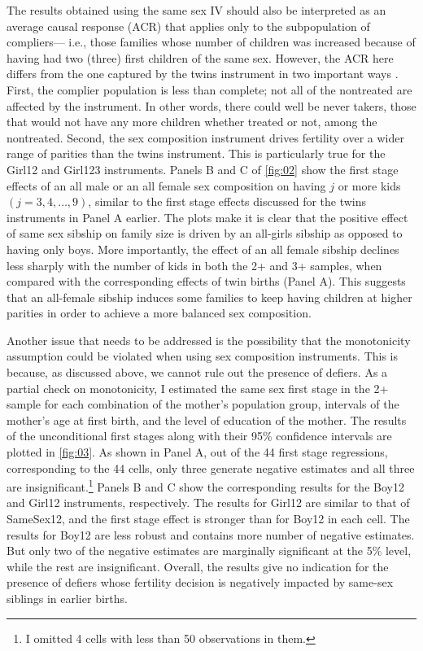 The results obtained using the same sex IV should also be interpreted as an average causal response (ACR) that applies only to the subpopulation of compliers--- i.e., those families whose number of children was increased because of having had two (three) first children of the same sex. However, the ACR here differs from the one captured by the twins instrument in two important ways \parencite{angrist_multiple_2010}. First, the complier population is less than complete; not all of the nontreated are affected by the instrument. In other words, there could well be never takers, those that would not have any more children whether treated or not, among the nontreated. Second, the sex composition instrument drives fertility over a wider range of parities than the twins instrument. This is particularly true for the Girl12 and Girl123 instruments. Panels B and C of \autoref{fig:02} show the first stage effects of an all male or an all female sex composition on having $ j $ or more kids $ (j = 3, 4, \dots, 9) $, similar to the first stage effects discussed for the twins instruments in Panel A earlier. The plots make it is clear that the positive effect of same sex sibship on family size is driven by an all-girls sibship as opposed to having only boys. More importantly, the effect of an all female sibship declines less sharply with the number of kids in both the 2+ and 3+ samples, when compared with the corresponding effects of twin births (Panel A). This suggests that an all-female sibship induces some families to keep having children at higher parities in order to achieve a more balanced sex composition. 

Another issue that needs to be addressed is the possibility that the monotonicity assumption could be violated when using sex composition instruments. This is because, as discussed above, we cannot rule out the presence of defiers. As a partial check on monotonicity, I estimated the same sex first stage in the 2+ sample for each combination of the mother's population group, intervals of the mother's age at first birth, and the level of education of the mother. The results of the unconditional first stages along with their 95\% confidence intervals are plotted in \autoref{fig:03}. As shown in Panel A, out of the 44 first stage regressions, corresponding to the 44 cells, only three generate negative estimates and all three are insignificant.\footnote{ I omitted 4 cells with less than 50 observations in them. } Panels B and C show the corresponding results for the Boy12 and Girl12 instruments, respectively. The results for Girl12 are similar to that of SameSex12, and the first stage effect is stronger than for Boy12 in each cell. The results for Boy12 are less robust and contains more number of negative estimates. But only two of the negative estimates are marginally significant at the 5\% level, while the rest are insignificant. Overall, the results give no indication for the presence of defiers whose fertility decision is negatively impacted by same-sex siblings in earlier births.






